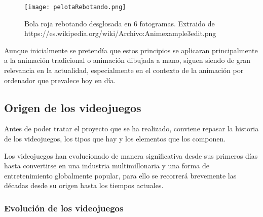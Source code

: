\begin{figure}[H]
   \centering
   \texttt{[image: pelotaRebotando.png]}
   \caption{Bola roja rebotando desglosada en 6 fotogramas. Extraido de https://es.wikipedia.org/wiki/Archivo:Animexample3edit.png }
\end{figure}

Aunque inicialmente se pretendía que estos principios se aplicaran principalmente a la animación tradicional o animación dibujada a mano, siguen siendo de gran relevancia en la actualidad, especialmente en el contexto de la animación por ordenador que prevalece hoy en día.


\subsection{Origen de los videojuegos}

Antes de poder tratar el proyecto que se ha realizado, conviene repasar la historia de los videojuegos, los tipos que hay y los elementos que los componen.

Los videojuegos han evolucionado de manera significativa desde sus primeros días hasta convertirse en una industria multimillonaria y una forma de entretenimiento globalmente popular, para ello se recorrerá brevemente las décadas desde su origen hasta los tiempos actuales.

\subsubsection{Evolución de los videojuegos}

